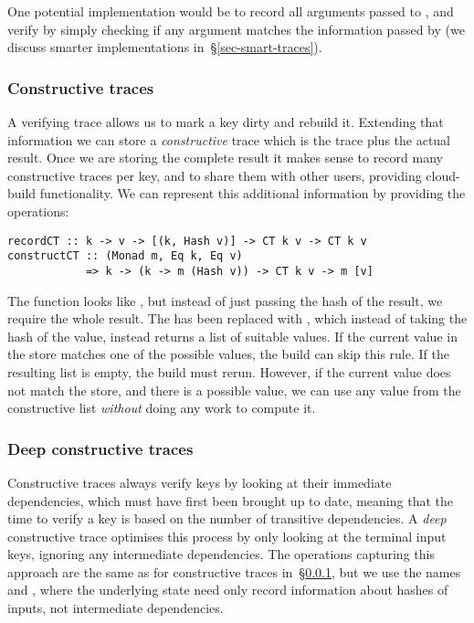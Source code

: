 One potential implementation would be to record all arguments passed to , and verify by simply checking if any argument matches the information passed by  (we discuss smarter implementations in~\S\ref{sec-smart-traces}).

\subsubsection{Constructive traces}\label{sec-constructive-traces}

A verifying trace allows us to mark a key dirty and rebuild it. Extending that information we can store a \emph{constructive} trace which is the trace plus the actual result. Once we are storing the complete result it makes sense to record many constructive traces per key, and to share them with other users, providing cloud-build functionality. We can represent this additional information by providing the operations:

\begin{verbatim}
recordCT :: k -> v -> [(k, Hash v)] -> CT k v -> CT k v
constructCT :: (Monad m, Eq k, Eq v)
            => k -> (k -> m (Hash v)) -> CT k v -> m [v]
\end{verbatim}

The function  looks like , but instead of just passing the hash of the result, we require the whole result. The  has been replaced with , which instead of taking the hash of the value, instead returns a list of suitable values. If the current value in the store matches one of the possible values, the build can skip this rule. If the resulting list is empty, the build must rerun. However, if the current value does not match the store, and there is a possible value, we can use any value from the constructive list \emph{without} doing any work to compute it.

\subsubsection{Deep constructive traces}\label{sec-deep-constructive-traces}

Constructive traces always verify keys by looking at their immediate dependencies, which must have first been brought up to date, meaning that the time to verify a key is based on the number of transitive dependencies. A \emph{deep} constructive trace optimises this process by only looking at the terminal input keys, ignoring any intermediate dependencies. The operations capturing this approach are the same as for constructive traces in~\S\ref{sec-constructive-traces}, but we use the names  and , where the underlying  state need only record information about hashes of inputs, not intermediate dependencies.


